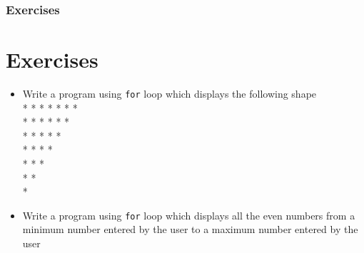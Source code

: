 \documentclass{beamer}
\begin{document}
\begin{frame}
    \frametitle{Exercises}
    \section{Exercises} %
    \label{sec:exercises}
    \begin{itemize}
        \item Write a program using \texttt{for} loop which displays the following shape \\ [0.2 in]
        * * * * * * * \\
        * * * * * * \\
        * * * * * \\
        * * * * \\
        * * * \\
        * * \\
        * \\
        \item Write a program using \texttt{for} loop which displays all the even numbers from a minimum number entered by the user to a maximum number entered by the user
    \end{itemize}
\end{frame}
\end{document}
